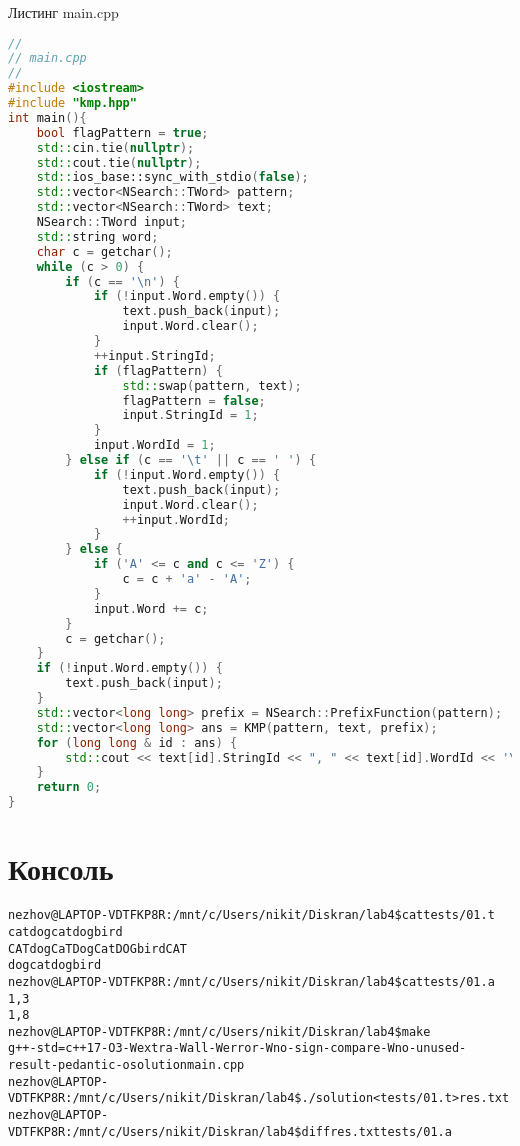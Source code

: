 \begin{center}Листинг main.cpp\end{center}
\begin{lstlisting}[language=C++]
//
// main.cpp
//
#include <iostream>
#include "kmp.hpp"
int main(){
    bool flagPattern = true;
    std::cin.tie(nullptr);
    std::cout.tie(nullptr);
    std::ios_base::sync_with_stdio(false);
    std::vector<NSearch::TWord> pattern;
    std::vector<NSearch::TWord> text;
    NSearch::TWord input;
    std::string word;
    char c = getchar();
    while (c > 0) {
        if (c == '\n') {
            if (!input.Word.empty()) {
                text.push_back(input);
                input.Word.clear();
            }
            ++input.StringId;
            if (flagPattern) {
                std::swap(pattern, text);
                flagPattern = false;
                input.StringId = 1;
            }
            input.WordId = 1;
        } else if (c == '\t' || c == ' ') {
            if (!input.Word.empty()) {
                text.push_back(input);
                input.Word.clear();
                ++input.WordId;
            }
        } else {
            if ('A' <= c and c <= 'Z') {
                c = c + 'a' - 'A';
            }
            input.Word += c;
        }
        c = getchar();
    }
    if (!input.Word.empty()) {
        text.push_back(input);
    }
    std::vector<long long> prefix = NSearch::PrefixFunction(pattern);
    std::vector<long long> ans = KMP(pattern, text, prefix);
    for (long long & id : ans) {
        std::cout << text[id].StringId << ", " << text[id].WordId << '\n';
    }
    return 0;
}
\end{lstlisting}
\pagebreak

\section{Консоль}
\begin{alltt}
nezhov@LAPTOP-VDTFKP8R:/mnt/c/Users/nikit/Diskran/lab4\$ cat tests/01.t
cat dog cat dog bird
CAT dog CaT Dog Cat DOG bird CAT
dog cat dog bird
nezhov@LAPTOP-VDTFKP8R:/mnt/c/Users/nikit/Diskran/lab4\$ cat tests/01.a
1, 3
1, 8
nezhov@LAPTOP-VDTFKP8R:/mnt/c/Users/nikit/Diskran/lab4\$ make
g++ -std=c++17 -O3 -Wextra -Wall -Werror -Wno-sign-compare -Wno-unused-result -pedantic -o solution main.cpp
nezhov@LAPTOP-VDTFKP8R:/mnt/c/Users/nikit/Diskran/lab4\$ ./solution < tests/01.t > res.txt
nezhov@LAPTOP-VDTFKP8R:/mnt/c/Users/nikit/Diskran/lab4\$ diff res.txt tests/01.a
\end{alltt}
\pagebreak

